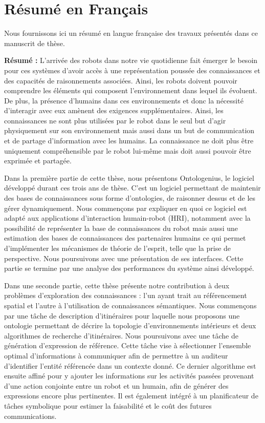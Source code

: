 \chapter{Résumé en Français}
\label{app:fr_long}

Nous fournissons ici un résumé en langue française des travaux présentés dans ce manuscrit de thèse.

\textbf{Résumé :}
L’arrivée des robots dans notre vie quotidienne fait émerger le besoin pour ces systèmes d’avoir accès à une représentation poussée des connaissances et des capacités de raisonnements associées. Ainsi, les robots doivent pouvoir comprendre les éléments qui composent l’environnement dans lequel ils évoluent. De plus, la présence d’humains dans ces environnements et donc la nécessité d’interagir avec eux amènent des exigences supplémentaires. Ainsi, les connaissances ne sont plus utilisées par le robot dans le seul but d’agir physiquement sur son environnement mais aussi dans un but de communication et de partage d’information avec les humains. La connaissance ne doit plus être uniquement compréhensible par le robot lui-même mais doit aussi pouvoir être exprimée et partagée.

Dans la première partie de cette thèse, nous présentons Ontologenius, le logiciel développé durant ces trois ans de thèse. C’est un logiciel permettant de maintenir des bases de connaissances sous forme d’ontologies, de raisonner dessus et de les gérer dynamiquement. Nous commençons par expliquer en quoi ce logiciel est adapté aux applications d’interaction humain-robot (HRI), notamment avec la possibilité de représenter la base de connaissances du robot mais aussi une estimation des bases de connaissances des partenaires humains ce qui permet d’implémenter les mécanismes de théorie de l’esprit, telle que la prise de perspective. Nous poursuivons avec une présentation de ses interfaces. Cette partie se termine par une analyse des performances du système ainsi développé.

Dans une seconde partie, cette thèse présente notre contribution à deux problèmes d’exploration des connaissances : l’un ayant trait au référencement spatial et l’autre à l’utilisation de connaissances sémantiques. Nous commençons par une tâche de description d’itinéraires pour laquelle nous proposons une ontologie permettant de décrire la topologie d’environnements intérieurs et deux algorithmes de recherche d’itinéraires. Nous poursuivons avec une tâche de génération d’expression de référence. Cette tâche vise à sélectionner l’ensemble optimal d’informations à communiquer afin de permettre à un auditeur d’identifier l’entité référencée dans un contexte donné. Ce dernier algorithme est ensuite affiné pour y ajouter les informations sur les activités passées provenant d’une action conjointe entre un robot et un humain, afin de générer des expressions encore plus pertinentes. Il est également intégré à un planificateur de tâches symbolique pour estimer la faisabilité et le coût des futures communications.


